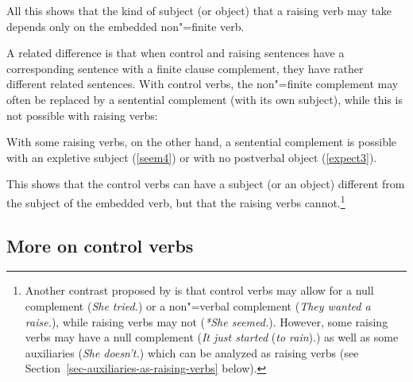 \noindent
All this shows that the kind of subject (or object) that a raising verb may take depends only on the embedded
non"=finite verb.

A related difference is that when control and raising sentences have a corresponding sentence with a finite clause complement, they have rather different related sentences.
With control verbs, the non"=finite complement may often be replaced by a sentential complement (with its own subject), while this is not possible with raising verbs:

\eal
{}
\zl

\eal
{}
\zl

With some raising verbs, on the other hand, a sentential complement is possible with an expletive
subject (\ref{seem4}) or with no postverbal object (\ref{expect3}). 

\eal
{}
\zl

\noindent
This shows that the control verbs can have a subject (or an object) different from the subject of
the embedded verb, but that the raising verbs cannot.\footnote{%
  Another contrast proposed by
  is that control verbs may allow for a null complement (\emph{She tried.}) or
  a non"=verbal complement (\emph{They wanted a raise.}), while raising verbs may not (\emph{*She
    seemed.}). However, some raising verbs may have a null complement (\emph{It just
    started} (\emph{to rain}).) as well as some auxiliaries (\emph{She doesn't.}) which can be analyzed as raising verbs (see
  Section~\ref{sec-auxiliaries-as-raising-verbs} below).%
} 

\subsection{More on control verbs}

